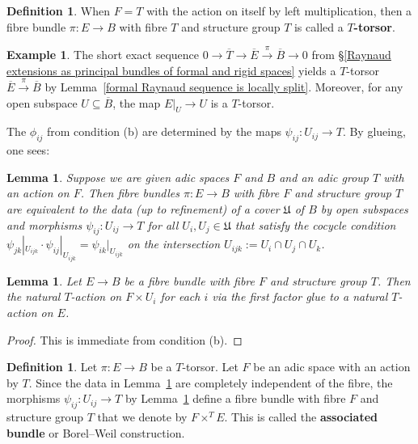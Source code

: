 \documentclass[10pt,oneside]{amsart}
\newtheorem{lemma}[theorem]{Lemma}
\theoremstyle{definition}
\newtheorem{definition}[theorem]{Definition}
\newtheorem{example}[theorem]{Example}
\begin{document}
	\begin{definition}
		When $F=T$ with the action on itself by left multiplication, then a fibre bundle $\pi\colon E\rightarrow B$ with fibre $T$ and structure group $T$ is called a \textbf{$T$-torsor}.
	\end{definition}
	
	\begin{example}
		The short exact sequence $0\rightarrow \overline{T}\rightarrow \overline{E}\xrightarrow{\pi} \overline{B}\rightarrow 0$ from \S\ref{Raynaud extensions as principal bundles of formal and rigid spaces} yields a $T$-torsor $\overline{E}\xrightarrow{\pi} \overline{B}$ by Lemma~\ref{formal Raynaud sequence is locally split}. Moreover, for any open subspace $U\subseteq \overline{B}$, the map $E|_U\rightarrow U$ is a $T$-torsor.
	\end{example}
	
	The $\phi_{ij}$ from condition (b) are determined by the maps $\psi_{ij}\colon U_{ij}\rightarrow T$. By glueing, one sees:
	\begin{lemma}\label{equivalent characterisation of principal $T$-bundle}
		Suppose we are given adic spaces $F$ and $B$ and an adic group $T$ with an action on $F$. Then fibre bundles $\pi\colon E\rightarrow B$ with fibre $F$ and structure group $T$ are equivalent to the data (up to refinement) of a cover $\mathfrak U$ of $B$ by open subspaces and morphisms $\psi_{ij}\colon U_{ij}\rightarrow T$ for all $U_i,U_j\in \mathfrak U$ that satisfy the cocycle condition $\psi_{jk}|_{U_{ijk}}\cdot \psi_{ij}|_{U_{ijk}}=\psi_{ik}|_{U_{ijk}}$ on the intersection $U_{ijk}:=U_i\cap U_j\cap U_k$.
	\end{lemma}
	\begin{lemma}
		Let $E\rightarrow B$ be a fibre bundle with fibre $F$ and structure group $T$. Then the natural $T$-action on $F\times U_{i}$ for each $i$ via the first factor glue to a natural $T$-action on $E$.
	\end{lemma}
	\begin{proof}
		This is immediate from condition (b).
	\end{proof}

	\begin{definition} \label{definition of Borel construction}
		Let $\pi\colon E\rightarrow B$ be a $T$-torsor. Let $F$ be an adic space with an action by $T$. Since the data in Lemma~\ref{equivalent characterisation of principal $T$-bundle} are completely independent of the fibre, the morphisms $\psi_{ij}\colon U_{ij}\rightarrow T$ by Lemma~\ref{equivalent characterisation of principal $T$-bundle} define a fibre bundle with fibre $F$ and structure group $T$ that we denote by $F\times^T E$. This is called the \textbf{associated bundle} or Borel--Weil construction.
	\end{definition}
	
 



 

	
	
	
\end{document}
